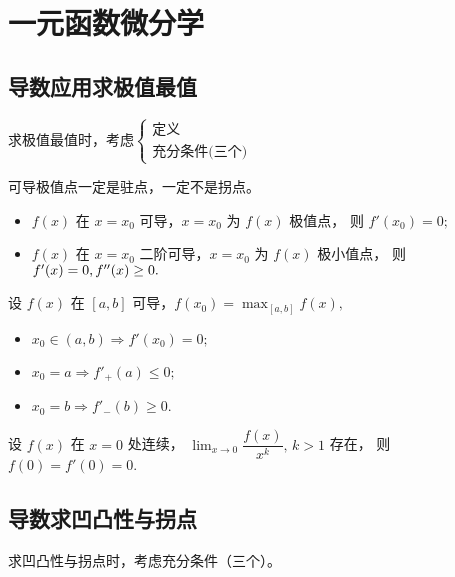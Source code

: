 \chapter{一元函数微分学}

\section{导数应用求极值最值}

求极值最值时，考虑$ \begin{cases}
    \textrm{定义}\\\textrm{充分条件(三个)}
\end{cases} $ 


可导极值点一定是驻点，一定不是拐点。


\begin{itemize}
    \item $ f(x) $ 在 $ x = x_0 $ 可导，$ x = x_0 $ 为 $ f(x) $ 极值点，
    则 $ f'(x_0) = 0; $ 
    \item $ f(x) $ 在 $ x = x_0 $ 二阶可导，$ x = x_0 $ 为 $ f(x) $ 极小值点，
    则 $ f'(x)=0,f^{\prime\prime}(x) \geq 0. $ 
\end{itemize}


设 $ f(x) $ 在 $ [a,b] $ 可导，$ f(x_0) = \max_{[a,b]}f(x), $ 
\begin{itemize}
    \item $ x_0\in (a,b) \Rightarrow f'(x_0) = 0; $ 
    \item $ x_0 = a \Rightarrow f'_+(a) \leq 0; $ 
    \item $ x_0 = b \Rightarrow f'_-(b) \geq 0. $ 
\end{itemize}


设 $ f(x) $ 在 $ x = 0 $ 处连续，
$ {\displaystyle\lim_{x\rightarrow 0}}\dfrac{f(x)}{x^k},\, k > 1 $ 存在，
则 $ f(0) = f'(0) = 0. $ 

\section{导数求凹凸性与拐点}

求凹凸性与拐点时，考虑充分条件（三个）。


